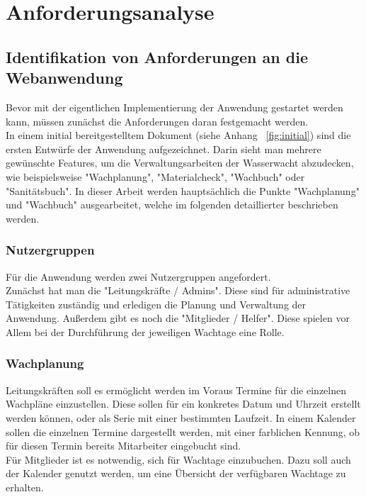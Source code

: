 \documentclass[fontsize=12pt,openright,oneside,paper=a4,BCOR=1cm]{scrbook}
\begin{document}

%
%

\chapter{Anforderungsanalyse}
\section{Identifikation von Anforderungen an die Webanwendung} 
Bevor mit der eigentlichen Implementierung der Anwendung gestartet werden kann, müssen zunächst die Anforderungen daran festgemacht werden. \\
In einem initial bereitgestelltem Dokument (siehe Anhang ~\ref{fig:initial}) sind die ersten Entwürfe der Anwendung aufgezeichnet. Darin sieht man mehrere gewünschte Features, um die Verwaltungsarbeiten der Wasserwacht abzudecken, wie beispielsweise "Wachplanung", "Materialcheck", "Wachbuch" oder "Sanitätsbuch". In dieser Arbeit werden hauptsächlich die Punkte "Wachplanung" und "Wachbuch" ausgearbeitet, welche im folgenden detaillierter beschrieben werden. \\ 

\subsection{Nutzergruppen}
Für die Anwendung werden zwei Nutzergruppen angefordert. \\
Zunächst hat man die "Leitungskräfte / Admins". Diese sind für administrative Tätigkeiten zuständig und erledigen die Planung und Verwaltung der Anwendung. 
Außerdem gibt es noch die "Mitglieder / Helfer". Diese spielen vor Allem bei der Durchführung der jeweiligen Wachtage eine Rolle.

\subsection{Wachplanung}
Leitungskräften soll es ermöglicht werden im Voraus Termine für die einzelnen Wachpläne einzustellen. Diese sollen für ein konkretes Datum und Uhrzeit erstellt werden können, oder als Serie mit einer bestimmten Laufzeit. In einem Kalender sollen die einzelnen Termine dargestellt werden, mit einer farblichen Kennung, ob für diesen Termin bereits Mitarbeiter eingebucht sind. \\
Für Mitglieder ist es notwendig, sich für Wachtage einzubuchen. Dazu soll auch der Kalender genutzt werden, um eine Übersicht der verfügbaren Wachtage zu erhalten.
\end{document}
